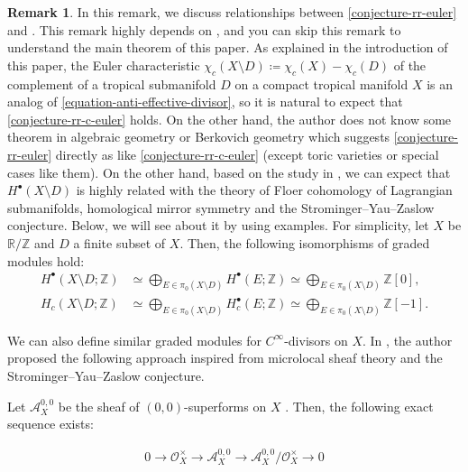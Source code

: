 \documentclass[a4paper,dvipdfmx,reqno,12pt]{amsart}
\theoremstyle{definition}
\newtheorem{remark}[theorem]{Remark}
\newcommand{\deq}{\coloneqq}
\numberwithin{equation}{section}
\begin{document}
\begin{remark}
\label{remark-c-infinity-divisor}
In this remark, we discuss relationships
between \cref{conjecture-rr-euler} and 
\cite{tsutsui2023graded}.
This remark highly depends on
\cite{tsutsui2023graded}, and you can
skip this remark to understand the main theorem of  
this paper. As explained in the introduction of this paper,
the Euler characteristic 
$\chi_c(X\setminus D)\deq \chi_c(X)-\chi_c(D)$ of 
the complement of a tropical submanifold $D$ on
a compact tropical manifold $X$ is an analog of  
\cref{equation-anti-effective-divisor}, so 
it is natural to expect that \cref{conjecture-rr-c-euler} holds.
On the other hand, the author does not know some theorem
in algebraic geometry or Berkovich geometry
which suggests \cref{conjecture-rr-euler} directly
as like \cref{conjecture-rr-c-euler}
(except toric varieties or special cases like them).
On the other hand, based on the study in \cite{tsutsui2023graded},
we can expect that 
$H^{\bullet}(X\setminus D)$ is highly related with
the theory of Floer cohomology of
Lagrangian submanifolds, homological mirror symmetry
and the Strominger--Yau--Zaslow conjecture.
Below, we will see about it by using examples. 
For simplicity, let 
$X$ be $\mathbb{R}/\mathbb{Z}$ and $D$ a finite subset of
$X$. Then, the following isomorphisms of graded modules hold:
\begin{align}
H^{\bullet}(X\setminus D;\mathbb{Z}) 
&\simeq \bigoplus_{E\in \pi_0(X\setminus D)} 
H^{\bullet}(E;\mathbb{Z})
\simeq \bigoplus_{E\in \pi_0(X\setminus D)} \mathbb{Z}[0], \\
H_c(X\setminus D;\mathbb{Z}) 
&\simeq \bigoplus_{E\in \pi_0(X\setminus D)} 
H^{\bullet}_c(E;\mathbb{Z})
\simeq \bigoplus_{E\in \pi_0(X\setminus D)} \mathbb{Z}[-1].
\end{align}

We can also define similar graded modules
for $C^{\infty}$-divisors on $X$.
In \cite{tsutsui2023graded},
the author proposed the following approach
inspired from microlocal sheaf theory and
the Strominger--Yau--Zaslow conjecture.

Let $\mathcal{A}^{0,0}_X$ be the sheaf of
$(0,0)$-superforms on $X$
\cite[Definition 2.24]{MR3903579}.
Then, the following exact sequence exists:

\begin{align}
0\to \mathcal{O}_X^{\times} \to \mathcal{A}^{0,0}_X
\to \mathcal{A}^{0,0}_X/\mathcal{O}_X^{\times} \to 0
\end{align}


\end{remark}
\end{document}

